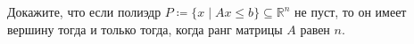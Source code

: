 Докажите, что если полиэдр $P \coloneqq \{x \mid Ax \le b\} \subseteq \mathbb{R}^n$ не пуст, то он имеет
вершину тогда и только тогда, когда ранг матрицы $A$ равен $n$.
